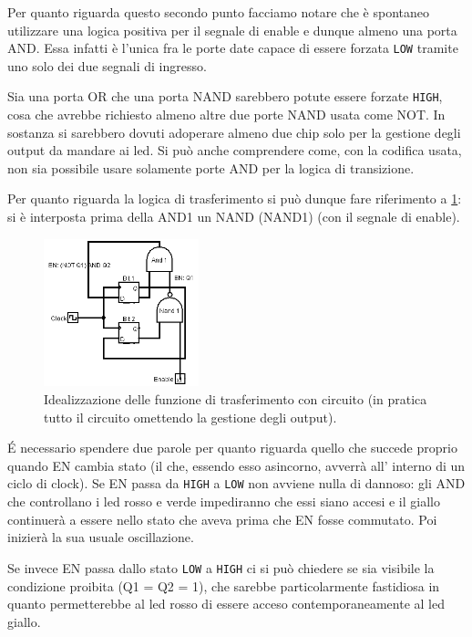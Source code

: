 \documentclass[a4paper,10pt]{article}
\def\code#1{\texttt{#1}}
\begin{document}
Per quanto riguarda questo secondo punto facciamo notare che è spontaneo utilizzare una logica positiva per il segnale di enable e dunque almeno una porta AND. Essa infatti è l'unica fra le porte date capace di essere forzata \code{LOW} tramite uno solo dei due segnali di ingresso. 

Sia una porta OR che una porta NAND sarebbero potute essere forzate \code{HIGH}, cosa che avrebbe richiesto almeno altre due porte NAND usata come NOT. In sostanza si sarebbero dovuti adoperare almeno due chip solo per la gestione degli output da mandare ai led. Si può anche comprendere come, con la codifica usata, non sia possibile usare solamente porte AND per la logica di transizione.
\newline
  
Per quanto riguarda la logica di trasferimento si può dunque fare riferimento a \cref{fig:solologica}: si è interposta prima della AND1 un NAND (NAND1) (con il segnale di enable). 


\begin{figure}[H]
	\centering
	\includegraphics[width=0.4\textwidth]{../grafici/solologica1.png}
	\caption{Idealizzazione delle funzione di trasferimento con circuito (in pratica tutto il circuito omettendo la gestione degli output).}
	\label{fig:solologica}
\end{figure}



\'E necessario spendere due parole per quanto riguarda quello che succede proprio quando EN cambia stato (il che, essendo esso asincorno, avverrà all' interno di un ciclo di clock). Se EN passa da \code{HIGH} a \code{LOW} non avviene nulla di dannoso: gli AND che controllano i led rosso e verde impediranno che essi siano accesi e il giallo continuerà a essere nello stato che aveva prima che EN fosse commutato. Poi inizierà la sua usuale oscillazione.

Se invece  EN passa dallo stato \code{LOW} a \code{HIGH} ci si può chiedere se sia visibile la condizione proibita (Q1 = Q2 = 1), che sarebbe particolarmente fastidiosa in quanto permetterebbe al led rosso di essere acceso contemporaneamente al led giallo. 
\end{document}
